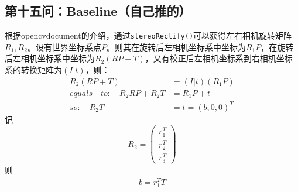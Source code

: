 \documentclass[UTF8]{ctexart}
\begin{document}
\subsection{第十五问：Baseline（自己推的）}
根据opencv\cite{opencvCameraCalibrationl18830}document的介绍，通过\verb"stereoRectify()"可以获得左右相机旋转矩阵$R_1,R_2$。设有世界坐标系点$P$。则其在旋转后左相机坐标系中坐标为$R_1P$，在旋转后左相机坐标系中坐标为$R_2(RP+T)$，又有校正后左相机坐标系到右相机坐标系的转换矩阵为$(I|t)$，则：
\begin{align}
R_2(RP+T)&=(I|t)(R_1P)\\
equals \quad to: \quad R_2RP+R_2T&=R_1P+t\\
so:\quad R_2T&=t=(b,0,0)^T
\end{align}
记$$R_2=\left( \begin{array}{c}  r_1^T \\ r_2^T \\ r_3^T \end{array} \right)$$ 则
\begin{align}
b=r_1^TT
\end{align}
\end{document}
